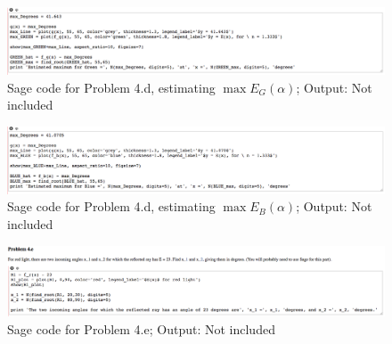 \documentclass[letterpaper, 12pt]{amsart}
\theoremstyle{definition}  %
\begin{document}
		\begin{figure}[h]
			\includegraphics[width=\textwidth]{sage/images/7.png}
			\caption{Sage code for Problem 4.d, estimating $\max E_{G}(\alpha)$; Output: Not included}
			\label{sage7}
		\end{figure}

		\begin{figure}[h]
			\includegraphics[width=\textwidth]{sage/images/8.png}
			\caption{Sage code for Problem 4.d, estimating $\max E_{B}(\alpha)$; Output: Not included}
			\label{sage8}
		\end{figure}

		\begin{figure}[h]
			\includegraphics[width=\textwidth]{sage/images/9.png}
			\caption{Sage code for Problem 4.e; Output: Not included}
			\label{sage9}
		\end{figure}
\end{document}

